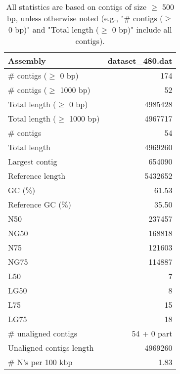\documentclass[12pt,a4paper]{article}
\begin{document}
\begin{table}[ht]
\begin{center}
\caption{All statistics are based on contigs of size $\geq$ 500 bp, unless otherwise noted (e.g., "\# contigs ($\geq$ 0 bp)" and "Total length ($\geq$ 0 bp)" include all contigs).}
\begin{tabular}{|l*{1}{|r}|}
\hline
Assembly & dataset\_480.dat \\ \hline
\# contigs ($\geq$ 0 bp) & 174 \\ \hline
\# contigs ($\geq$ 1000 bp) & 52 \\ \hline
Total length ($\geq$ 0 bp) & 4985428 \\ \hline
Total length ($\geq$ 1000 bp) & 4967717 \\ \hline
\# contigs & 54 \\ \hline
Total length & 4969260 \\ \hline
Largest contig & 654090 \\ \hline
Reference length & 5432652 \\ \hline
GC (\%) & 61.53 \\ \hline
Reference GC (\%) & 35.50 \\ \hline
N50 & 237457 \\ \hline
NG50 & 168818 \\ \hline
N75 & 121603 \\ \hline
NG75 & 114887 \\ \hline
L50 & 7 \\ \hline
LG50 & 8 \\ \hline
L75 & 15 \\ \hline
LG75 & 18 \\ \hline
\# unaligned contigs & 54 + 0 part \\ \hline
Unaligned contigs length & 4969260 \\ \hline
\# N's per 100 kbp & 1.83 \\ \hline
\end{tabular}
\end{center}
\end{table}
\end{document}
